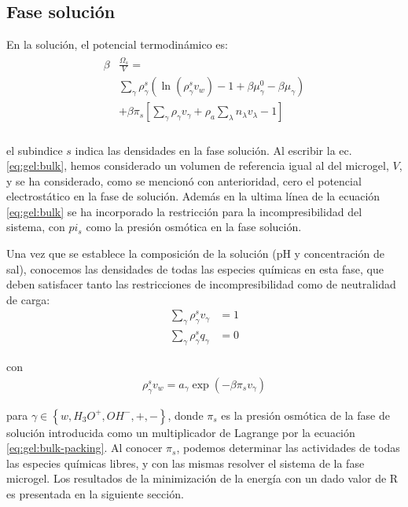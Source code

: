 \subsection{Fase soluci\'on}\label{sec:gel:fase-solucion}

En la soluci\'on, el potencial termodin\'amico es:
%
%
\begin{align}
\begin{aligned}
\beta&\frac{\Omega_s}{V}=\\& \sum_{\gamma   } {\rho^s_\gamma\left(\ln(\rho_\gamma^sv_w) -1 + \beta\mu_\gamma^0 - \beta\mu_\gamma\right)} \\
& +\beta\pi_{s} \left[ \sum_{\gamma } \rho_\gamma v_\gamma + \rho_a \sum_\lambda n_\lambda v_\lambda -1 \right] \\
\end{aligned}
\label{eq:gel:bulk}
\end{align}

\noindent el subindice  $s$  indica las densidades en la fase soluci\'on.
Al escribir la ec. \ref{eq:gel:bulk}, hemos considerado un volumen de referencia igual al del microgel, $V$, y se ha considerado, como se mencion\'o con anterioridad, cero el potencial electrost\'atico en la fase de soluci\'on.
Adem\'as en la ultima l\'inea de la ecuaci\'on \ref{eq:gel:bulk} se ha incorporado la restricci\'on para la incompresibilidad del sistema, con $pi_s$ como la presi\'on osm\'otica en la fase soluci\'on.

Una vez que se establece la composición de la soluci\'on (pH y concentraci\'on de sal), conocemos las densidades de todas las especies qu\'imicas en esta fase, que deben satisfacer tanto las restricciones de incompresibilidad como de neutralidad de carga:
%
%
\begin{align}
\sum_{\gamma  } \rho_\gamma^s v_\gamma  &=1\label{eq:gel:bulk-packing}\\
\sum_{\gamma  } \rho_\gamma^s q_\gamma  &=0
\end{align}

\noindent con
%
%
\begin{align}
\rho_\gamma^s v_w= a_\gamma \exp(-\beta\pi_s v_\gamma)
\label{eq:gel:bulk-electroneutrality}
\end{align}



\noindent para $\gamma \in \left\{ w, H_3O^+, OH^-, +,- \right\}$, donde $\pi_s$ es la presi\'on osm\'otica de la fase de soluci\'on introducida como un multiplicador de Lagrange por la ecuaci\'on \ref{eq:gel:bulk-packing}.
Al conocer $\pi_s$, podemos determinar las actividades de todas las especies qu\'imicas libres, y con las mismas resolver el sistema de la fase microgel.
Los resultados de la minimizaci\'on de la energ\'ia con un dado valor de R es presentada en la siguiente secci\'on.

